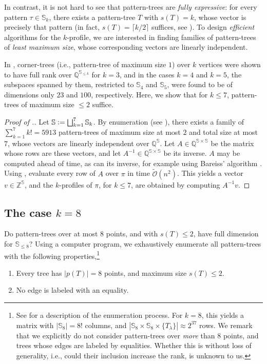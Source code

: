 \documentclass{article}
\newcommand{\QQ}{\mathbb{Q}}
\newcommand{\ZZ}{\mathbb{Z}}
\newcommand{\eqdef}{\vcentcolon=}
\theoremstyle{remark}
\newcommand{\Otilde}[1]{\widetilde{\mathcal{O}}\left( #1 \right)}
\theoremstyle{plain}
\begin{document}
In contrast, it is not hard to see that pattern-trees are \textit{fully expressive}:
for every pattern $\tau \in \mathbb{S}_k$,
there exists a pattern-tree $T$ with $s(T)=k$, whose vector is precisely that pattern
(in fact, $s(T)=\lceil k/2 \rceil$ suffices, see ).
To design \textit{efficient} algorithms for the $k$-profile,
we are interested in finding families of pattern-trees of \textit{least maximum size},
whose corresponding vectors are linearly independent.

In \cite{even2021counting}, corner-trees (i.e., pattern-tree of maximum size $1$) over $k$ vertices
were shown to have full rank over $\QQ^{\mathbb{S}_{\le k}}$ for $k=3$, and
in the cases $k=4$ and $k=5$, the subspaces spanned by them,
restricted to $\mathbb{S}_4$ and $\mathbb{S}_5$,
were found to be of dimensions only $23$ and $100$, respectively.
Here, we show that for $k \le 7$, pattern-trees of maximum size $\le 2$ suffice. 

\begin{proof}
[Proof of .] Let $\mathbb{S} \eqdef \bigsqcup_{k=1}^7 \mathbb{S}_k$.
By enumeration (see ),
there exists a family of $\sum_{k=1}^7 k! = 5913$ pattern-trees of maximum size at most $2$ and total size at most $7$,
whose vectors are linearly independent over $\QQ^{\mathbb{S}}$.
Let $A \in \QQ^{\mathbb{S} \times \mathbb{S}}$ be the matrix whose rows are these vectors,
and let $A^{-1} \in \QQ^{\mathbb{S} \times \mathbb{S}}$ be its inverse.
$A$ may be computed ahead of time, as can its inverse, for example using Bareiss' algorithm \cite{bareiss1968sylvester}.
Using , evaluate every row of $A$ over $\pi$ in time $\Otilde{n^2}$.
This yields a vector $v \in \ZZ^{\mathbb{S}}$,
and the $k$-profiles of $\pi$, for $k \le 7$, are obtained by computing $A^{-1} v$.    
\end{proof}

\subsection{The case \texorpdfstring{$k=8$}{k=8}}
\label{subsect:s_8_not_spanned}
Do pattern-trees over at most $8$ points, and with $s(T) \le 2$, have full dimension for $\mathbb{S}_{\le 8}$?
Using a computer program, we exhaustively enumerate all pattern-trees with the following properties,\footnote{
See  for a description of the enumeration process.
For $k=8$, this yields a matrix with $|\mathbb{S}_8|=8!$ columns, and $|\mathbb{S}_8 \times \mathbb{S}_8 \times \{ T_\lambda \}| \approx 2^{37}$ rows.
We remark that we explicitly do not consider pattern-trees over \textit{more} than $8$ points, and trees whose edges are labeled by equalities.
Whether this is without loss of generality, i.e., could their inclusion increase the rank, is unknown to us.
}
\begin{enumerate}
    \item Every tree has $|p(T)| = 8$ points, and maximum size $s(T) \le 2$. 
    \item No edge is labeled with an equality.
\end{enumerate}
\end{document}
